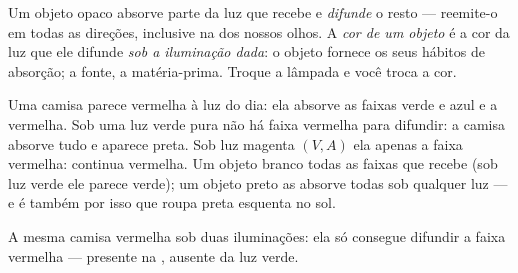 \begin{definition}\label{def:g11:color-light-sources:objectcolor}
Um objeto opaco absorve parte da luz que recebe e
\emph{difunde} o resto --- reemite-o em todas as direções,
inclusive na dos nossos olhos. A \emph{cor de um objeto} é a cor da luz que ele difunde \emph{sob a iluminação dada}: o
objeto fornece os seus hábitos de absorção; a fonte, a matéria-prima.
Troque a lâmpada e você troca a cor.
\end{definition}

\begin{example}\label{ex:g11:color-light-sources:redshirt}
Uma camisa parece vermelha à luz do dia: ela absorve as faixas verde e
azul e  a vermelha. Sob uma luz verde pura não há faixa vermelha
para difundir: a camisa absorve tudo e aparece preta. Sob luz magenta
$(V, A)$ ela  apenas a faixa vermelha: continua vermelha. Um
objeto branco  todas as faixas que recebe (sob luz verde ele
parece verde); um objeto preto as absorve todas sob qualquer luz --- e é
também por isso que roupa preta esquenta no sol.
\end{example}

\begin{omfigure}
\qquad
{}

{\small A mesma camisa vermelha sob duas iluminações: ela só consegue
difundir a faixa vermelha --- presente na , ausente da luz
verde.}
\end{omfigure}

